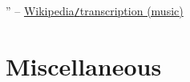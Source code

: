 \documentclass{article}
\begin{document}
'' -- \href{https://en.wikipedia.org/wiki/Transcription_(music)}{Wikipedia{\tt/}transcription (music)}


\section{Miscellaneous}


\printbibliography[heading=bibintoc]
	
\end{document}
